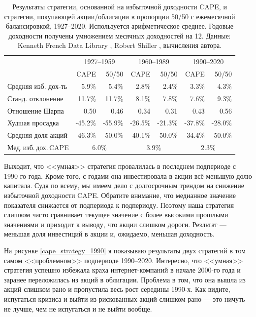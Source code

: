\begin{table}[h!]
\centering
\begin{tabular}{l|r|r|r|r|r|r}
& \multicolumn{2}{c|}{1927--1959} & \multicolumn{2}{c|}{1960--1989} & \multicolumn{2}{c}{1990--2020} \\ 
\cline{2-7}
                       & CAPE    & 50/50   & CAPE    & 50/50   & CAPE    & 50/50 \\ \hline
Средняя изб. дох-ть    & 5.9\%   & 5.4\%   & 2.8\%   & 2.4\%   & 3.3\%   & 4.3\%   \\
Станд. отклонение      & 11.7\%  & 11.7\%  & 8.1\%   & 7.8\%   & 7.6\%   & 9.3\%   \\
Отношение Шарпа        & 0.50    & 0.46    & 0.34    & 0.31    & 0.43    & 0.56    \\
Худшая просадка        & -45.2\% & -55.9\% & -26.5\% & -21.3\% & -37.8\% & -28.0\% \\
Средняя доля акций     & 46.3\%  & 50.0\%  & 40.1\%  & 50.0\%  & 34.4\%  & 50.0\%  \\ 
\cline{2-7}
Мед.\,изб.\,дох.\,CAPE & \multicolumn{2}{c|}{6.0\%} & \multicolumn{2}{c|}{3.9\%} & \multicolumn{2}{c}{2.3\%} 
\end{tabular}
\caption{Результаты стратегии, основанной на избыточной доходности CAPE, и стратегии, покупающей акции/облигации в пропорции 50/50 с ежемесячной балансировкой, 1927--2020. Используется арифметическое среднее. Годовые доходности получены умножением месячных доходностей на 12. Данные: Kenneth French Data Library \cite{kennethFrench}, Robert Shiller \cite{shillerOnline}, вычисления автора.}
\label{cape_strategy_three_periods_table}
\end{table}

Выходит, что <<умная>> стратегия провалилась в последнем подпериоде с 1990-го года. Кроме того, с годами она инвестировала в акции всё меньшую долю капитала. Судя по всему, мы имеем дело с долгосрочным трендом на снижение избыточной доходности CAPE. Обратите внимание, что медианное значение показателя снижается от подпериода к подпериоду. Поэтому наша стратегия слишком часто сравнивает текущее значение с более высокими прошлыми значениями и приходит к выводу, что акции слишком дороги. Резльтат --- меньшая доля инвестиций в акции и, ожидаемо, меньшая доходность.

На рисунке \ref{cape_strategy_1990} я показываю результаты двух стратегий в том самом <<проблемном>> подпериоде 1990--2020. Интересно, что <<умная>> стратегия успешно избежала краха интернет-компаний в начале 2000-го года и заранее переложилась из акций в облигации. Проблема в том, что она вышла из акций слишком рано и пропустила весь рост середины 1990-х. Как видите, испугаться кризиса и выйти из рискованных акций слишком рано --- это ничуть не лучше, чем не испугаться и не выйти вообще.


